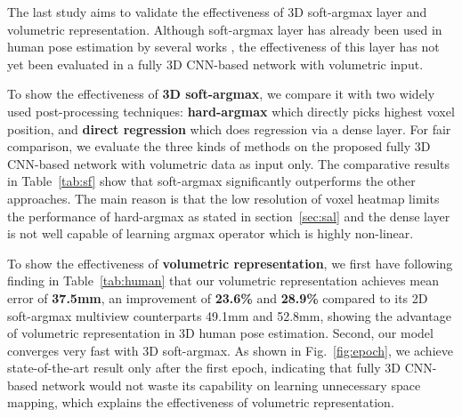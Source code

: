 \documentclass[10pt,twocolumn,letterpaper]{article}
\begin{document}
\label{sec:sa}
\begin{table}
\begin{center}
\end{center}
\vspace{-0.3cm}
\caption{Mean joint error results for three kinds of output layers. FC stands for fully connected layer (See \S\ref{sec:soft_argmax}).}
\vspace{-0.6cm}
\label{tab:sf}
\end{table}

The last study aims to validate the effectiveness of 3D soft-argmax layer and volumetric representation. Although soft-argmax layer has already been used in human pose estimation by several works \cite{sun2018integral,luvizon20182d,nibali2018}, the effectiveness of this layer has not yet been evaluated in a fully 3D CNN-based network with volumetric input. 

To show the effectiveness of \textbf{3D soft-argmax}, we compare it with two widely used post-processing techniques: \textbf{hard-argmax} which directly picks highest voxel position, and \textbf{direct regression} which does regression via a dense layer. For fair comparison, we evaluate the three kinds of methods on the proposed fully 3D CNN-based network with volumetric data as input only. The comparative results in Table~\ref{tab:sf} show that soft-argmax significantly outperforms the other approaches. The main reason is that the low resolution of voxel heatmap limits the performance of hard-argmax as stated in section~\ref{sec:sal} and the dense layer is not well capable of learning argmax operator which is highly non-linear. 

To show the effectiveness of \textbf{volumetric representation}, we first have following finding in Table~\ref{tab:human} that our volumetric representation achieves mean error of \textbf{37.5mm}, an improvement of \textbf{23.6\%} and \textbf{28.9\%} compared to its 2D soft-argmax multiview counterparts 49.1mm\cite{Abdolrahim2018} and 52.8mm\cite{tome2018rethinking}, showing the advantage of volumetric representation in 3D human pose estimation. Second, our model converges very fast with 3D soft-argmax. As shown in Fig.~\ref{fig:epoch}, we achieve state-of-the-art result only after the first epoch, indicating that fully 3D CNN-based network would not waste its capability on learning unnecessary space mapping, which explains the effectiveness of volumetric representation. 
\end{document}
